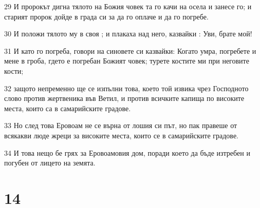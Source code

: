 \par 29 И пророкът дигна тялото на Божия човек та го качи на осела и занесе го; и старият пророк дойде в града си за да го оплаче и да го погребе.
\par 30 И положи тялото му в своя ; и плакаха над него, казвайки : Уви, брате мой!
\par 31 И като го погреба, говори на синовете си казвайки: Когато умра, погребете и мене в гроба, гдето е погребан Божият човек; турете костите ми при неговите кости;
\par 32 защото непременно ще се изпълни това, което той извика чрез Господното слово против жертвеника във Ветил, и против всичките капища по високите места, които са в самарийските градове.
\par 33 Но след това Еровоам не се върна от лошия си път, но пак правеше от всякакви люде жреци за високите места, които се в самарийските градове.
\par 34 И това нещо бе грях за Еровоамовия дом, поради което да бъде изтребен и погубен от лицето на земята.

\chapter{14}

